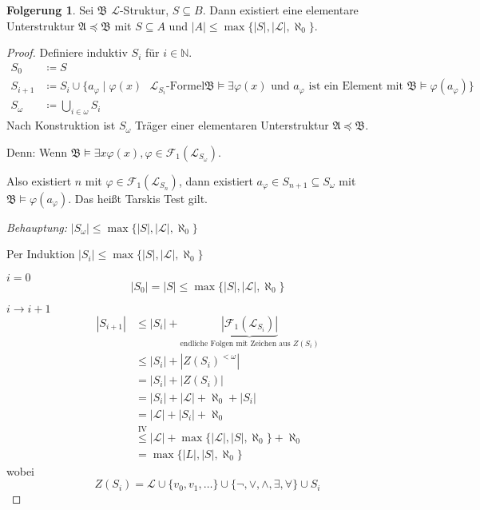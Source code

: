 \documentclass[12pt,parskip=full]{scrartcl}
\newcommand{\setN}{\mathbb{N}}
\newcommand{\abs}[1]{{\left| #1 \right|}}
\newcommand{\heading}{\underline}
\theoremstyle{definition}
\newtheorem{corollary}[theorem]{Folgerung}
\begin{document}
	\begin{corollary}
		\label{cor:elUnterstruktExistiert}
		Sei $\mathfrak{B}$ $\mathcal{L}$-Struktur, $S \subseteq B$. Dann existiert eine elementare Unterstruktur $\mathfrak{A} \preccurlyeq \mathfrak{B}$ mit $S \subseteq A$ und $\abs{A} \leq \max \{ \abs{S}, \abs{\mathcal{L}}, \aleph_0 \}$.
	\end{corollary}

	\begin{proof}
		Definiere induktiv $S_i$ für $i \in \setN$.
		\begin{align*}
			S_0 &\coloneqq S \\
			S_{i+1} &\coloneqq S_i \cup \{ a_\varphi \mid \varphi(x) \text{ $\mathcal{L}_{S_i}$-Formel} \mathfrak{B} \models \exists \varphi(x) \text{ und $a_\varphi$ ist ein Element mit $\mathfrak{B} \models \varphi(a_\varphi)$} \} \\
			S_\omega &\coloneqq \bigcup_{i \in \omega} S_i
		\end{align*}
		Nach Konstruktion ist $S_\omega$ Träger einer elementaren Unterstruktur $\mathfrak{A} \preccurlyeq \mathfrak{B}$.
		
		Denn: Wenn $\mathfrak{B} \models \exists x \varphi(x), \varphi \in \mathcal{F}_1(\mathcal{L}_{S_\omega})$.
		
		Also existiert $n$ mit $\varphi \in \mathcal{F}_1(\mathcal{L}_{S_n})$, dann existiert $a_\varphi \in S_{n+1} \subseteq S_\omega$ mit $\mathfrak{B} \models \varphi(a_\varphi)$. Das heißt Tarskis Test gilt.
		
		\textit{Behauptung:} $\abs{S_\omega} \leq \max \{ \abs{S}, \abs{\mathcal{L}}, \aleph_0 \}$
		
		Per Induktion $\abs{S_i} \leq \max \{ \abs{S}, \abs{\mathcal{L}}, \aleph_0 \}$
		
		\heading{$i=0$}
		\begin{equation*}
			\abs{S_0} = \abs{S} \leq \max \{ \abs{S}, \abs{\mathcal{L}}, \aleph_0 \}
		\end{equation*}
		
		\heading{$i \to i+1$}
		\begin{align*}
			\abs{S_{i+1}} &\leq \abs{S_i} + \underbrace{\abs{\mathcal{F}_1(\mathcal{L}_{S_i})}}_\text{endliche Folgen mit Zeichen aus $Z(S_i)$} \\
			&\leq \abs{S_i} + \abs{Z(S_i)^{< \omega}} \\
			&= \abs{S_i} + \abs{Z(S_i)} \\
			&= \abs{S_i} + \abs{\mathcal{L}} + \aleph_0 + \abs{S_i} \\
			&= \abs{\mathcal{L}} + \abs{S_i} + \aleph_0 \\
			&\overset{\text{IV}}{\leq} \abs{\mathcal{L}} + \max \{ \abs{\mathcal{L}}, \abs{S}, \aleph_0 \} + \aleph_0 \\
			&= \max \{ \abs{L}, \abs{S}, \aleph_0 \}
		\end{align*}
		wobei
		\begin{equation*}
			Z(S_i) = \mathcal{L} \cup \{ v_0, v_1, \dots \} \cup \{ \lnot, \lor, \land, \exists, \forall \} \cup S_i
		\end{equation*}
	\end{proof}
\end{document}
